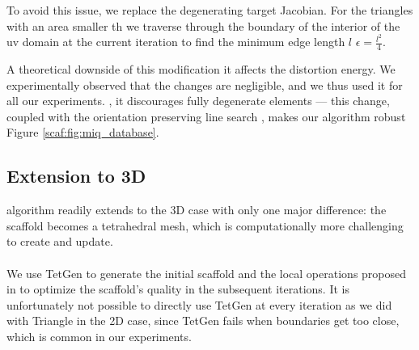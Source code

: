 To avoid this issue, we replace the degenerating target  Jacobian. For the triangles with an area smaller th  we traverse through the boundary of the interior of the uv domain at the current iteration to find the minimum edge length $l$  $\epsilon = \frac{l^2}{4}$.

A theoretical downside of this modification  it affects the distortion energy. We experimentally observed that the changes are negligible, and we thus used it for all our experiments. , it discourages fully degenerate elements --- this change, coupled with the orientation preserving line search \cite{Smith:2015}, makes our algorithm robust  Figure \ref{scaf:fig:miq_database}.

\subsection{Extension to 3D}

 algorithm readily extends to the 3D case with only one major difference: the scaffold becomes a tetrahedral mesh, which is computationally more challenging to create and update.
\paragraph{}
We use TetGen \cite{Si:2015} to generate the initial scaffold and the local operations proposed in \cite{Klingner:2009} to optimize the scaffold's quality in the subsequent iterations. 
%
It is unfortunately not possible to directly use TetGen at every iteration as we did with Triangle in the 2D case, since TetGen fails when boundaries get too close, which is common in our experiments.

